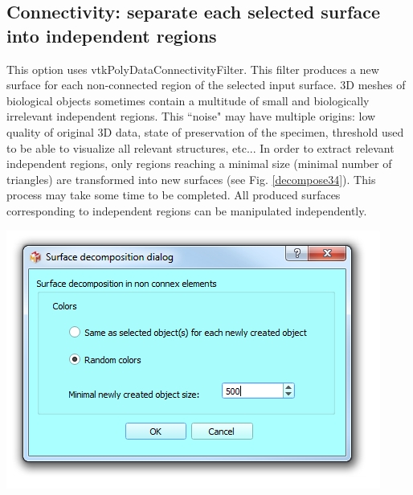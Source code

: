 \subsection{Connectivity: separate each selected surface into independent regions}
\noindent
\begin{minipage}{0.5\textwidth}
This option uses vtkPolyDataConnectivityFilter. This filter produces a new surface for each non-connected region of the selected input surface. 3D meshes of biological objects sometimes contain a multitude of small and biologically irrelevant independent regions. This ``noise" may have multiple origins: low quality of original 3D data, state of preservation of the specimen, threshold used to be able to visualize all relevant structures, etc... In order to extract relevant independent regions, only regions reaching a minimal size (minimal number of triangles) are transformed into new surfaces (see Fig. \ref{decompose34}). This process may take some time to be completed. All produced surfaces corresponding to independent regions can be manipulated independently.\end{minipage}    
\begin{minipage}{0.5\textwidth}\centering
  \includegraphics[scale=0.5]{images/09/structure/surface_decomposition_dialog.png}
 \end{minipage} 
\noindent


